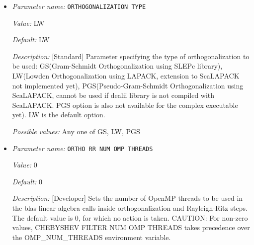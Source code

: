 \begin{itemize}
{\it Value:} 20


{\it Default:} 10


{\it Description:} [Standard] Number of Kohn-Sham wavefunctions to be computed. For insulators use N/2+(10-20) and for metals use 20 percent more than N/2 (atleast 10 more). N is the total number of electrons.


{\it Possible values:} An integer $n$ such that $0\leq n \leq 2147483647$
\item {\it Parameter name:} {\tt ORTHOGONALIZATION TYPE}
\label{parameters:SCF parameters/Eigen_2dsolver_2fChebyshev solver related parameters/ORTHOGONALIZATION TYPE}
\label{parameters:SCF_20parameters/Eigen_2dsolver_2fChebyshev_20solver_20related_20parameters/ORTHOGONALIZATION_20TYPE}


{\it Value:} LW


{\it Default:} LW


{\it Description:} [Standard] Parameter specifying the type of orthogonalization to be used: GS(Gram-Schmidt Orthogonalization using SLEPc library), LW(Lowden Orthogonalization using LAPACK, extension to ScaLAPACK not implemented yet), PGS(Pseudo-Gram-Schmidt Orthogonalization using ScaLAPACK, cannot be used if dealii library is not compiled with ScaLAPACK. PGS option is also not available for the complex executable yet). LW is the default option.


{\it Possible values:} Any one of GS, LW, PGS
\item {\it Parameter name:} {\tt ORTHO RR NUM OMP THREADS}
\label{parameters:SCF parameters/Eigen_2dsolver_2fChebyshev solver related parameters/ORTHO RR NUM OMP THREADS}
\label{parameters:SCF_20parameters/Eigen_2dsolver_2fChebyshev_20solver_20related_20parameters/ORTHO_20RR_20NUM_20OMP_20THREADS}


{\it Value:} 0


{\it Default:} 0


{\it Description:} [Developer] Sets the number of OpenMP threads to be used in the blas linear algebra calls inside orthogonalization and Rayleigh-Ritz steps. The default value is 0, for which no action is taken. CAUTION: For non-zero values, CHEBYSHEV FILTER NUM OMP THREADS takes precedence over the OMP\_NUM\_THREADS environment variable.



\end{itemize}
